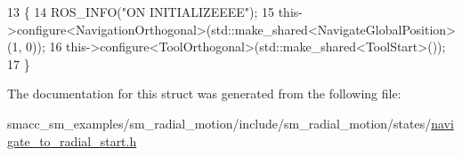 \begin{DoxyCode}
13   \{
14      ROS\_INFO(\textcolor{stringliteral}{"ON INITIALIZEEEE"});
15      this->configure<NavigationOrthogonal>(std::make\_shared<NavigateGlobalPosition>(1, 0));
16      this->configure<ToolOrthogonal>(std::make\_shared<ToolStart>());
17   \}
\end{DoxyCode}


The documentation for this struct was generated from the following file\+:\begin{DoxyCompactItemize}
\item 
smacc\+\_\+sm\+\_\+examples/sm\+\_\+radial\+\_\+motion/include/sm\+\_\+radial\+\_\+motion/states/\hyperlink{navigate__to__radial__start_8h}{navigate\+\_\+to\+\_\+radial\+\_\+start.\+h}\end{DoxyCompactItemize}
